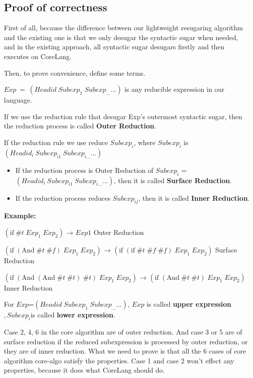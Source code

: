 \subsection{Proof of correctness}

First of all, because the difference between our lightweight resugaring algorithm and the existing one is that we only desugar the syntactic sugar when needed, and in the existing approach, all syntactic sugar desugars firstly and then executes on CoreLang.

Then, to prove convenience, define some terms.

$Exp~=~(Headid\;Subexp_{1}\;Subexp_{\ldots} \ldots)$ is any reducible expression in our language.

If we use the reduction rule that desugar Exp's outermost syntactic sugar, then the reduction process is called {\bfseries Outer Reduction}.

If the reduction rule we use reduce $Subexp_{i}$, where $Subexp_{i}$ is $(Headid_{i}~Subexp_{i1}~Subexp_{i\ldots} \ldots)$
\begin{itemize}
	\item If the reduction process is Outer Reduction of $Subexp_{i}$ = $(Headid_{i}~Subexp_{i1}~Subexp_{i\ldots} \ldots)$, then it is called {\bfseries Surface Reduction}.
	\item If the reduction process reduces $Subexp_{ij}$, then it is called {\bfseries Inner Reduction}.
\end{itemize}

{\bfseries Example:}

$(\mbox{if}\; \#t\; Exp_{1}\; Exp_{2})$ → $Exp1$ \hfill Outer Reduction

$(\mbox{if}\; (\mbox{And}\; \#t\; \#f)\; Exp_{1}\; Exp_{2})$ → $(\mbox{if}\; (\mbox{if}\; \#t\; \#f\; \#f)\; Exp_{1}\; Exp_{2})$ \hfill Surface Reduction

$(\mbox{if}\; (\mbox{And}\; (\mbox{And}\; \#t\; \#t)\; \#t) \; Exp_{1}\; Exp_{2})$ → $(\mbox{if}\; (\mbox{And}\; \#t\; \#t)\; Exp_{1}\; Exp_{2})$ \hfill Inner Reduction

\begin{Def}
For $Exp$=$(Headid\;Subexp_{1}\;Subexp_{\ldots} \ldots)$, $Exp$ is called {\bfseries upper expression}$,Subexp_{i}$is called {\bfseries lower expression}.
\end{Def}

Case 2, 4, 6 in the core algorithm are of outer reduction. And case 3 or 5 are of surface reduction if the reduced subexpression is processed by outer reduction, or they are of inner reduction.
What we need to prove is that all the 6 cases of core algorithm core-algo satisfy the properties. Case 1 and case 2 won't effect any properties, because it does what CoreLang should do.

